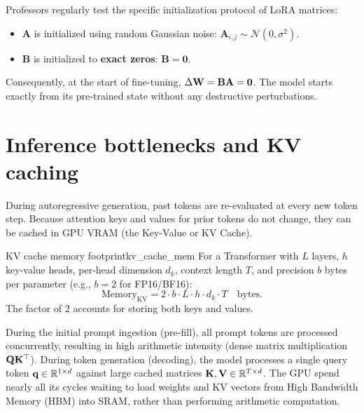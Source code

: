 \documentclass[../../main.tex]{subfiles}
\begin{document}
\begin{examinsight}
Professors regularly test the specific initialization protocol of LoRA matrices:
\begin{itemize}
    \item $\mathbf{A}$ is initialized using random Gaussian noise: $\mathbf{A}_{i,j} \sim \mathcal{N}(0, \sigma^2)$.
    \item $\mathbf{B}$ is initialized to \textbf{exact zeros}: $\mathbf{B} = \mathbf{0}$.
\end{itemize}
Consequently, at the start of fine-tuning, $\Delta \mathbf{W} = \mathbf{B} \mathbf{A} = \mathbf{0}$. The model starts exactly from its pre-trained state without any destructive perturbations.
\end{examinsight}

\section{Inference bottlenecks and KV caching}
During autoregressive generation, past tokens are re-evaluated at every new token step. Because attention keys and values for prior tokens do not change, they can be cached in GPU VRAM (the Key-Value or KV Cache).

\begin{theorem}{KV cache memory footprint}{kv_cache_mem}
For a Transformer with $L$ layers, $h$ key-value heads, per-head dimension $d_k$, context length $T$, and precision $b$ bytes per parameter (e.g., $b=2$ for FP16/BF16):
\begin{equation}
\text{Memory}_{\text{KV}} = 2 \cdot b \cdot L \cdot h \cdot d_k \cdot T \quad \text{bytes}.
\end{equation}
The factor of $2$ accounts for storing both keys and values.
\end{theorem}

\begin{intuition}
During the initial prompt ingestion (pre-fill), all prompt tokens are processed concurrently, resulting in high arithmetic intensity (dense matrix multiplication $\mathbf{Q} \mathbf{K}^\top$).
During token generation (decoding), the model processes a single query token $\mathbf{q} \in \mathbb{R}^{1 \times d}$ against large cached matrices $\mathbf{K}, \mathbf{V} \in \mathbb{R}^{T \times d}$. The GPU spend nearly all its cycles waiting to load weights and KV vectors from High Bandwidth Memory (HBM) into SRAM, rather than performing arithmetic computation.
\end{intuition}
\end{document}
